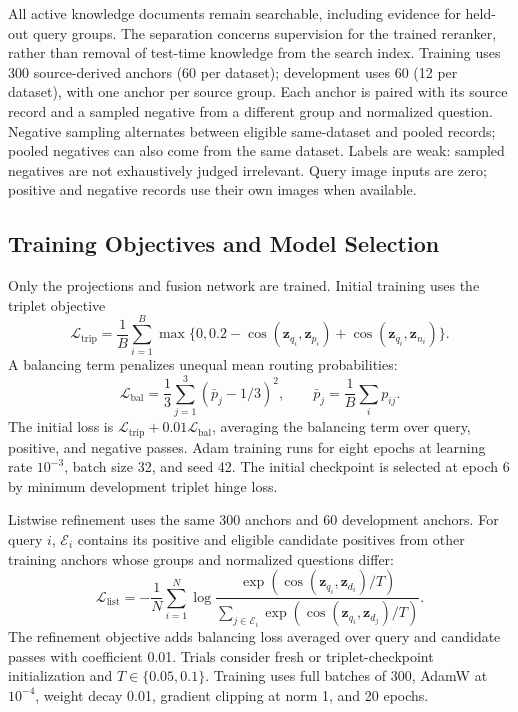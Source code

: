 \documentclass[10pt,a4paper]{article}
\begin{document}
All active knowledge documents remain searchable, including evidence for held-out query groups. The separation concerns supervision for the trained reranker, rather than removal of test-time knowledge from the search index. Training uses 300 source-derived anchors (60 per dataset); development uses 60 (12 per dataset), with one anchor per source group. Each anchor is paired with its source record and a sampled negative from a different group and normalized question. Negative sampling alternates between eligible same-dataset and pooled records; pooled negatives can also come from the same dataset. Labels are weak: sampled negatives are not exhaustively judged irrelevant. Query image inputs are zero; positive and negative records use their own images when available.

\subsection{Training Objectives and Model Selection}
Only the projections and fusion network are trained. Initial training uses the triplet objective
\begin{equation}
\mathcal L_{\mathrm{trip}}=\frac1B\sum_{i=1}^B
\max\{0,0.2-\cos(\mathbf z_{q_i},\mathbf z_{p_i})+\cos(\mathbf z_{q_i},\mathbf z_{n_i})\}.
\end{equation}
A balancing term penalizes unequal mean routing probabilities:
\begin{equation}
\mathcal L_{\mathrm{bal}}=\frac13\sum_{j=1}^3(\bar p_j-1/3)^2,
\qquad \bar p_j=\frac1B\sum_i p_{ij}.
\end{equation}
The initial loss is $\mathcal L_{\mathrm{trip}}+0.01\mathcal L_{\mathrm{bal}}$, averaging the balancing term over query, positive, and negative passes. Adam training runs for eight epochs at learning rate $10^{-3}$, batch size 32, and seed 42. The initial checkpoint is selected at epoch 6 by minimum development triplet hinge loss.

Listwise refinement uses the same 300 anchors and 60 development anchors. For query $i$, $\mathcal E_i$ contains its positive and eligible candidate positives from other training anchors whose groups and normalized questions differ:
\begin{equation}
\mathcal L_{\mathrm{list}}=-\frac1N\sum_{i=1}^N\log
\frac{\exp(\cos(\mathbf z_{q_i},\mathbf z_{d_i})/T)}
{\sum_{j\in\mathcal E_i}\exp(\cos(\mathbf z_{q_i},\mathbf z_{d_j})/T)}.
\end{equation}
The refinement objective adds balancing loss averaged over query and candidate passes with coefficient 0.01. Trials consider fresh or triplet-checkpoint initialization and $T\in\{0.05,0.1\}$. Training uses full batches of 300, AdamW at $10^{-4}$, weight decay 0.01, gradient clipping at norm 1, and 20 epochs.
\end{document}
